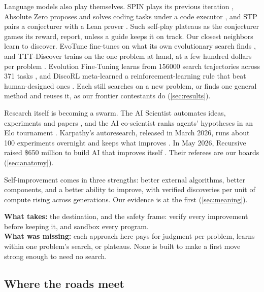 Language models also play themselves. SPIN plays its previous iteration
\citep{chen2024spin}, Absolute Zero proposes and solves coding tasks under a
code executor \citep{zhao2025absolutezero}, and STP pairs a conjecturer with
a Lean prover \citep{dong2025stp}. Such self-play plateaus as the
conjecturer games its reward, \citet{bailey2026sgs} report, unless a guide
keeps it on track. Our closest neighbors learn to discover. EvoTune
fine-tunes on what its own evolutionary search finds \citep{evotune2025},
and TTT-Discover trains on the one problem at hand, at a few hundred
dollars per problem \citep{tttdiscover2026}. Evolution Fine-Tuning learns
from \num{156000} search trajectories across 371 tasks \citep{eft2026}, and
DiscoRL meta-learned a reinforcement-learning rule that beat human-designed
ones \citep{oh2025discorl}. Each still searches on a new problem, or finds
one general method and reuses it, as our frontier contestants do
(\cref{sec:results}).

Research itself is becoming a swarm. The AI Scientist automates ideas,
experiments and papers \citep{lu2024aiscientist}, and the AI co-scientist
ranks agents' hypotheses in an Elo tournament
\citep{gottweis2025coscientist}. Karpathy's autoresearch, released in March
2026, runs about 100 experiments overnight and keeps what improves
\citep{karpathy2026autoresearch}. In May 2026, Recursive raised
\$650 million to build AI that improves itself
\citep{recursive2026techcrunch}. Their referees are our boards
(\cref{sec:anatomy}).

Self-improvement comes in three strengths: better external algorithms,
better components, and a better ability to improve, with verified
discoveries per unit of compute rising across generations. Our evidence is
at the first (\cref{sec:meaning}).

\smallskip
\noindent\textbf{What \EZ{} takes:} the destination, and the safety frame:
verify every improvement before keeping it, and sandbox every program.\\
\textbf{What was missing:} each approach here pays for judgment per problem,
learns within one problem's search, or plateaus. None is built to make a
first move strong enough to need no search.

\subsection{Where the roads meet}\label{sub:road-meet}

